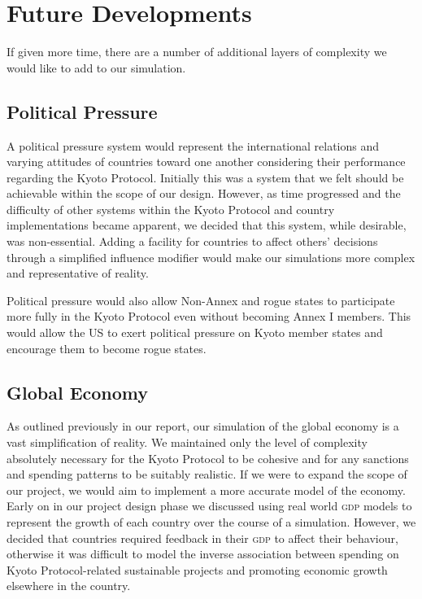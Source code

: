 \section{Future Developments}

If given more time, there are a number of additional layers of complexity we would like to add to our simulation. 

\subsection{Political Pressure}

A political pressure system would represent the international relations and varying attitudes of countries toward one another considering their performance regarding the Kyoto Protocol. Initially this was a system that we felt should be achievable within the scope of our design. However, as time progressed and the difficulty of other systems within the Kyoto Protocol and country implementations became apparent, we decided that this system, while desirable, was non-essential. Adding a facility for countries to affect others' decisions through a simplified influence modifier would make our simulations more complex and representative of reality.

Political pressure would also allow Non-Annex and rogue states to participate more fully in the Kyoto Protocol even without becoming Annex I members. This would allow the US to exert political pressure on Kyoto member states and encourage them to become rogue states.

\subsection{Global Economy}

As outlined previously in our report, our simulation of the global economy is a vast simplification of reality. We maintained only the level of complexity absolutely necessary for the Kyoto Protocol to be cohesive and for any sanctions and spending patterns to be suitably realistic. If we were to expand the scope of our project, we would aim to implement a more accurate model of the economy. Early on in our project design phase we discussed using real world \textsc{gdp} models to represent the growth of each country over the course of a simulation. However, we decided that countries required feedback in their \textsc{gdp} to affect their behaviour, otherwise it was difficult to model the inverse association between spending on Kyoto Protocol-related sustainable projects and promoting economic growth elsewhere in the country.

